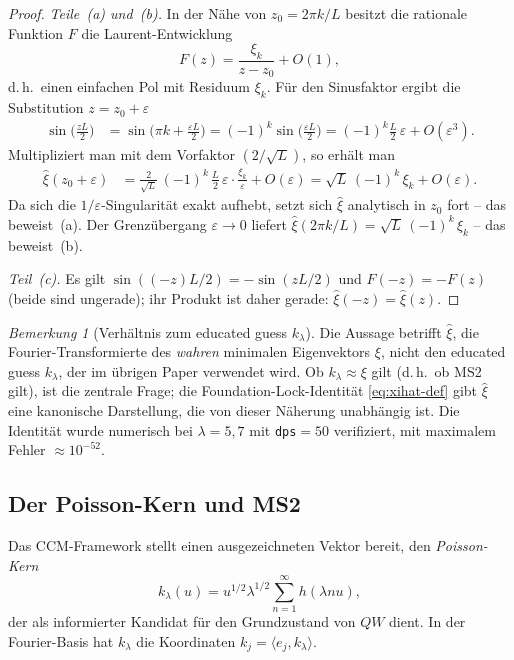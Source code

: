\documentclass[12pt,a4paper]{article}
\theoremstyle{definition}
\theoremstyle{remark}
\newtheorem{remark}[theorem]{Bemerkung}
\newcommand{\ip}[2]{\langle #1, #2 \rangle}
\begin{document}
\begin{proof}
\textit{Teile~(a) und~(b).}
In der Nähe von $z_0 = 2\pi k / L$ besitzt die rationale Funktion $F$ die
Laurent-Entwicklung
\[
  F(z) = \frac{\xi_k}{z - z_0} + O(1),
\]
d.\,h.\ einen einfachen Pol mit Residuum $\xi_k$.  Für den Sinusfaktor
ergibt die Substitution $z = z_0 + \varepsilon$
\begin{align*}
  \sin\!\bigl(\tfrac{zL}{2}\bigr)
  &= \sin\!\bigl(\pi k + \tfrac{\varepsilon L}{2}\bigr)
   = (-1)^k \sin\!\bigl(\tfrac{\varepsilon L}{2}\bigr)
   = (-1)^k \tfrac{L}{2}\,\varepsilon + O(\varepsilon^3).
\end{align*}
Multipliziert man mit dem Vorfaktor $(2/\sqrt{L})$, so erhält man
\begin{align*}
  \hat{\xi}(z_0 + \varepsilon)
  &= \frac{2}{\sqrt{L}}\,(-1)^k\,\frac{L}{2}\,\varepsilon
     \cdot \frac{\xi_k}{\varepsilon} + O(\varepsilon)
   = \sqrt{L}\,(-1)^k\,\xi_k + O(\varepsilon).
\end{align*}
Da sich die $1/\varepsilon$-Singularität exakt aufhebt, setzt sich
$\hat{\xi}$ analytisch in $z_0$ fort -- das beweist~(a). Der Grenzübergang
$\varepsilon \to 0$ liefert $\hat{\xi}(2\pi k/L) = \sqrt{L}\,(-1)^k\,\xi_k$
-- das beweist~(b).

\textit{Teil~(c).}
Es gilt $\sin((-z)L/2) = -\sin(zL/2)$ und $F(-z) = -F(z)$ (beide sind
ungerade); ihr Produkt ist daher gerade: $\hat{\xi}(-z) = \hat{\xi}(z)$.
\end{proof}

\begin{remark}[Verhältnis zum educated guess $k_\lambda$]
\label{rem:xihat-vs-klambda}
Die Aussage betrifft $\hat{\xi}$, die Fourier-Transformierte des
\emph{wahren} minimalen Eigenvektors $\xi$, nicht den educated guess
$k_\lambda$, der im übrigen Paper verwendet wird. Ob $k_\lambda\approx\xi$
gilt (d.\,h.\ ob MS2 gilt), ist die zentrale Frage; die Foundation-Lock-Identität
\eqref{eq:xihat-def} gibt $\hat{\xi}$ eine kanonische Darstellung, die von
dieser Näherung unabhängig ist. Die Identität wurde numerisch bei
$\lambda=5, 7$ mit \texttt{dps}$=50$ verifiziert, mit maximalem
Fehler $\approx 10^{-52}$.
\end{remark}

\subsection{Der Poisson-Kern und MS2}

Das CCM-Framework stellt einen ausgezeichneten Vektor bereit, den
\emph{Poisson-Kern}
\begin{equation}
\label{eq:poisson}
k_\lambda(u) = u^{1/2} \lambda^{1/2} \sum_{n=1}^\infty h(\lambda n u),
\end{equation}
der als informierter Kandidat für den Grundzustand von $QW$ dient.
In der Fourier-Basis hat $k_\lambda$ die Koordinaten $k_j = \ip{e_j}{k_\lambda}$.
\end{document}
